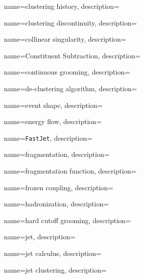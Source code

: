 {
    name=clustering history,
    description={
    }
}

{
    name=clustering discontinuity,
    description={
    }
}

{
    name=collinear singularity,
    description={
    }
}

{
    name=Constituent Subtraction,
    description={
    }
}

{
    name=continuous grooming,
    description={
    }
}


{
    name=de-clustering algorithm,
    description={
    }
}


{
  name=event shape,
  description={}
}

{
  name=energy flow,
  description={}
}

{
    name=\texttt{FastJet},
    description={
    }
}

{
  name=fragmentation,
  description={}
}

{
  name=fragmentation function,
  description={}
}




{
  name=frozen coupling,
  description={}
}

{
  name=hadronization,
  description={}
}

{
  name=hard cutoff grooming,
  description={}
}


{
  name=jet,
  description={}
}

{
  name=jet calculus,
  description={}
}

{
  name=jet clustering,
  description={}
}

